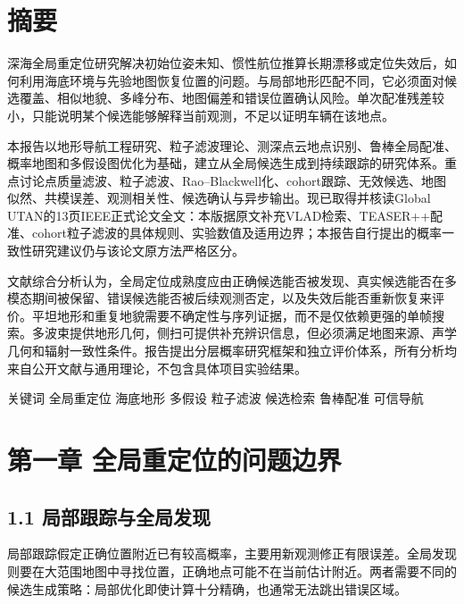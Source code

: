 \hypertarget{ux6458ux8981}{%
\section{摘要}\label{ux6458ux8981}}

深海全局重定位研究解决初始位姿未知、惯性航位推算长期漂移或定位失效后，如何利用海底环境与先验地图恢复位置的问题。与局部地形匹配不同，它必须面对候选覆盖、相似地貌、多峰分布、地图偏差和错误位置确认风险。单次配准残差较小，只能说明某个候选能够解释当前观测，不足以证明车辆在该地点。

本报告以地形导航工程研究、粒子滤波理论、测深点云地点识别、鲁棒全局配准、概率地图和多假设图优化为基础，建立从全局候选生成到持续跟踪的研究体系。重点讨论点质量滤波、粒子滤波、Rao--Blackwell化、cohort跟踪、无效候选、地图似然、共模误差、观测相关性、候选确认与异步输出。现已取得并核读Global UTAN的13页IEEE正式论文全文：本版据原文补充VLAD检索、TEASER++配准、cohort粒子滤波的具体规则、实验数值及适用边界；本报告自行提出的概率一致性研究建议仍与该论文原方法严格区分。

文献综合分析认为，全局定位成熟度应由正确候选能否被发现、真实候选能否在多模态期间被保留、错误候选能否被后续观测否定，以及失效后能否重新恢复来评价。平坦地形和重复地貌需要不确定性与序列证据，而不是仅依赖更强的单帧搜索。多波束提供地形几何，侧扫可提供补充辨识信息，但必须满足地图来源、声学几何和辐射一致性条件。报告提出分层概率研究框架和独立评价体系，所有分析均来自公开文献与通用理论，不包含具体项目实验结果。

关键词 全局重定位 海底地形 多假设 粒子滤波 候选检索 鲁棒配准 可信导航

\hypertarget{ux7b2cux4e00ux7ae0-ux5168ux5c40ux91cdux5b9aux4f4dux7684ux95eeux9898ux8fb9ux754c}{%
\section{第一章 全局重定位的问题边界}\label{ux7b2cux4e00ux7ae0-ux5168ux5c40ux91cdux5b9aux4f4dux7684ux95eeux9898ux8fb9ux754c}}

\hypertarget{ux5c40ux90e8ux8ddfux8e2aux4e0eux5168ux5c40ux53d1ux73b0}{%
\subsection{1.1 局部跟踪与全局发现}\label{ux5c40ux90e8ux8ddfux8e2aux4e0eux5168ux5c40ux53d1ux73b0}}

局部跟踪假定正确位置附近已有较高概率，主要用新观测修正有限误差。全局发现则要在大范围地图中寻找位置，正确地点可能不在当前估计附近。两者需要不同的候选生成策略：局部优化即使计算十分精确，也通常无法跳出错误区域。

